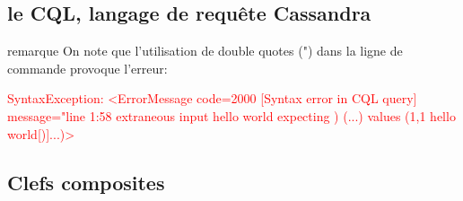 \subsection{le CQL, langage de requête Cassandra}


\par 
\begin{block}{remarque}
On note que l\rq utilisation de double quotes (") dans la ligne de commande provoque l'erreur: \newline
\begin{tt}
\textcolor{red}{
SyntaxException: <ErrorMessage code=2000 [Syntax error in CQL query]
message="line 1:58 extraneous input hello world expecting ) (...) values (1,1 hello world[)]...)>
}
\end{tt}
\end{block}

\subsection{Clefs composites}

